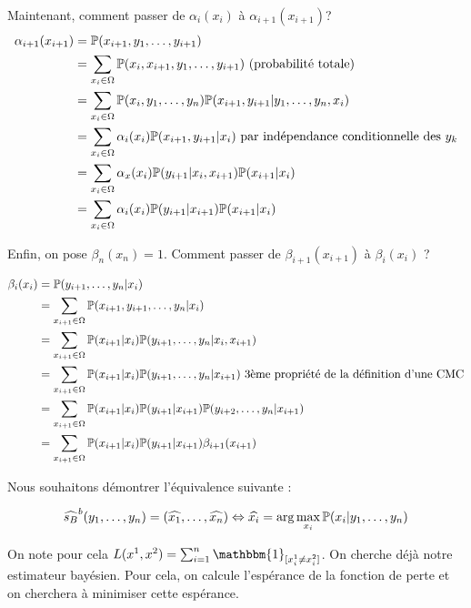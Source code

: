 Maintenant, comment passer de $\alpha_i(x_i)$ à  $\alpha_{i+1}(x_{i+1})$?
\newcommand{\sumx}{\sum_{x_i \in \Omega}}
\begin{equation*}
\begin{split}
  \alpha_{i+1}(x_{i+1}) &= \P(x_{i+1},y_1,\ldots,y_{i+1}) \\
  &= \sumx \P(x_i,x_{i+1}, y_1, \ldots, y_{i+1}) \text{ (probabilité totale)} \\
  &= \sumx \P(x_i, y_1,\ldots,y_n) \P(x_{i+1},y_{i+1} \vert y_1,\ldots, y_n, x_i) \\
  &= \sumx \alpha_i(x_i) \P(x_{i+1}, y_{i+1} \vert x_i) \text{ par indépendance conditionnelle des } y_k \\
  &= \sumx \alpha_x(x_i) \P(y_{i+1} \vert x_i, x_{i+1}) \P(x_{i+1}\vert x_i) \\
  &= \sumx \alpha_i(x_i) \P(y_{i+1}\vert x_{i+1}) \P(x_{i+1} \vert x_i) 
\end{split}
\end{equation*}

Enfin, on pose $\beta_n(x_n) = 1$. Comment passer de $\beta_{i+1}(x_{i+1})$ à $\beta_i(x_i)$ ?

\renewcommand{\sumx}{\sum_{x_{i+1} \in \Omega}}
\begin{equation*}
\begin{split}
  \beta_{i}(x_{i}) &= \P(y_{i+1},\ldots,y_n\vert x_{i}) \\
  &= \sumx \P(x_{i+1}, y_{i+1},\ldots,y_n\vert x_{i}) \\
  &= \sumx \P(x_{i+1}\vert x_i)\P(y_{i+1},\ldots,y_n\vert x_{i}, x_{i+1}) \\
  &= \sumx \P(x_{i+1}\vert x_i)\P(y_{i+1},\ldots,y_n\vert x_{i+1}) \text{ 3ème propriété de la définition d'une CMC} \\
  &= \sumx \P(x_{i+1}\vert x_i) \P(y_{i+1} \vert x_{i+1}) \P(y_{i+2},\ldots,y_n\vert x_{i+1})  \\
  &= \sumx \P(x_{i+1}\vert x_i) \P(y_{i+1} \vert x_{i+1}) \beta_{i+1}(x_{i+1})
\end{split}
\end{equation*}

Nous souhaitons démontrer l'équivalence suivante :

\[ \widehat{s_B}^b(y_1,\ldots,y_n) = (\widehat{x_1}, \ldots, \widehat{x_n}) \Leftrightarrow \widehat{x_i} = \arg \max_{x_i} \P(x_i\vert y_1,\ldots,y_n) \]

On note pour cela $L(x^1, x^2) = \sum_{i=1}^n \mathbbm{1}_{[x_i^1 \neq x_i^2]}$. On cherche déjà notre estimateur bayésien. Pour cela, on calcule l'espérance de la fonction de perte et
on cherchera à minimiser cette espérance.

